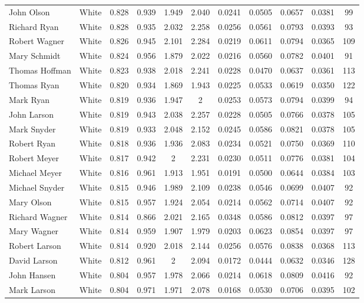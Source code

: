 \documentclass[]{article}
\begin{document}
\begin{tabular}{lcccccccccc}
John Olson & White & 0.828 & 0.939 & 1.949 & 2.040 & 0.0241 & 0.0505 & 0.0657 & 0.0381 & 99 \\
Richard Ryan & White & 0.828 & 0.935 & 2.032 & 2.258 & 0.0256 & 0.0561 & 0.0793 & 0.0393 & 93 \\
Robert Wagner & White & 0.826 & 0.945 & 2.101 & 2.284 & 0.0219 & 0.0611 & 0.0794 & 0.0365 & 109 \\
Mary Schmidt & White & 0.824 & 0.956 & 1.879 & 2.022 & 0.0216 & 0.0560 & 0.0782 & 0.0401 & 91 \\
Thomas Hoffman & White & 0.823 & 0.938 & 2.018 & 2.241 & 0.0228 & 0.0470 & 0.0637 & 0.0361 & 113 \\
Thomas Ryan & White & 0.820 & 0.934 & 1.869 & 1.943 & 0.0225 & 0.0533 & 0.0619 & 0.0350 & 122 \\
Mark Ryan & White & 0.819 & 0.936 & 1.947 & 2 & 0.0253 & 0.0573 & 0.0794 & 0.0399 & 94 \\
John Larson & White & 0.819 & 0.943 & 2.038 & 2.257 & 0.0228 & 0.0505 & 0.0766 & 0.0378 & 105 \\
Mark Snyder & White & 0.819 & 0.933 & 2.048 & 2.152 & 0.0245 & 0.0586 & 0.0821 & 0.0378 & 105 \\
Robert Ryan & White & 0.818 & 0.936 & 1.936 & 2.083 & 0.0234 & 0.0521 & 0.0750 & 0.0369 & 110 \\
Robert Meyer & White & 0.817 & 0.942 & 2 & 2.231 & 0.0230 & 0.0511 & 0.0776 & 0.0381 & 104 \\
Michael Meyer & White & 0.816 & 0.961 & 1.913 & 1.951 & 0.0191 & 0.0500 & 0.0644 & 0.0384 & 103 \\
Michael Snyder & White & 0.815 & 0.946 & 1.989 & 2.109 & 0.0238 & 0.0546 & 0.0699 & 0.0407 & 92 \\
Mary Olson & White & 0.815 & 0.957 & 1.924 & 2.054 & 0.0214 & 0.0562 & 0.0714 & 0.0407 & 92 \\
Richard Wagner & White & 0.814 & 0.866 & 2.021 & 2.165 & 0.0348 & 0.0586 & 0.0812 & 0.0397 & 97 \\
Mary Wagner & White & 0.814 & 0.959 & 1.907 & 1.979 & 0.0203 & 0.0623 & 0.0854 & 0.0397 & 97 \\
Robert Larson & White & 0.814 & 0.920 & 2.018 & 2.144 & 0.0256 & 0.0576 & 0.0838 & 0.0368 & 113 \\
David Larson & White & 0.812 & 0.961 & 2 & 2.094 & 0.0172 & 0.0444 & 0.0632 & 0.0346 & 128 \\
John Hansen & White & 0.804 & 0.957 & 1.978 & 2.066 & 0.0214 & 0.0618 & 0.0809 & 0.0416 & 92 \\
Mark Larson & White & 0.804 & 0.971 & 1.971 & 2.078 & 0.0168 & 0.0530 & 0.0706 & 0.0395 & 102 \\

\end{tabular}
\end{document}

